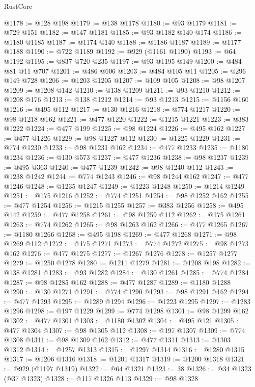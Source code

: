 \begin{lexlean}{RustCore}
\begin{coremodule}
@1178 := @128 @198
@1179 := @138 @1178
@1180 := @93 @1179
@1181 := @729 @151
@1182 := @147 @1181
@1185 := @93 @1182 @140 @174
@1186 := @1180 @1185
@1187 := @1174 @140
@1188 := @1186 @1187
@1189 := @1177 @1188
@1190 := @722 @1189
@1192 := @929 (@1161 @1190)
@1193 := @64 @1192
@1195 := @837 @720 @235
@1197 := @93 @1195 @149
@1200 := @484 @81 @11 @707
@1201 := @486 @606
@1203 := @484 @105 @11
@1205 := @296 @149 @728
@1206 := @1203 @1205
@1207 := @109 @105
@1208 := @98 @1207
@1209 := @1208 @142
@1210 := @138 @1209
@1211 := @93 @1210
@1212 := @1208 @176
@1213 := @138 @1212
@1214 := @93 @1213
@1215 := @1156 @160
@1216 := @495 @112
@1217 := @130 @1216
@1218 := @774 @1217
@1220 := @98 @1218 @162
@1221 := @477 @1220
@1222 := @1215 @1221
@1223 := @383 @1222
@1224 := @477 @199
@1225 := @98 @1224
@1226 := @495 @162
@1227 := @477 @1226
@1229 := @98 @1227 @112
@1230 := @1225 @1229
@1231 := @774 @1230
@1233 := @98 @1231 @162
@1234 := @477 @1233
@1235 := @1180 @1234
@1236 := @130 @573
@1237 := @477 @1236
@1238 := @98 @1237
@1239 := @495 @363
@1240 := @477 @1239
@1242 := @98 @1240 @112
@1243 := @1238 @1242
@1244 := @774 @1243
@1246 := @98 @1244 @162
@1247 := @477 @1246
@1248 := @1235 @1247
@1249 := @1223 @1248
@1250 := @1214 @1249
@1251 := @175 @1216
@1252 := @774 @1251
@1254 := @98 @1252 @162
@1255 := @477 @1254
@1256 := @1215 @1255
@1257 := @383 @1256
@1258 := @495 @142
@1259 := @477 @1258
@1261 := @98 @1259 @112
@1262 := @175 @1261
@1263 := @774 @1262
@1265 := @98 @1263 @162
@1266 := @477 @1265
@1267 := @1180 @1266
@1268 := @495 @198
@1269 := @477 @1268
@1271 := @98 @1269 @112
@1272 := @175 @1271
@1273 := @774 @1272
@1275 := @98 @1273 @162
@1276 := @477 @1275
@1277 := @1267 @1276
@1278 := @1257 @1277
@1279 := @1250 @1278
@1280 := @1211 @1279
@1281 := @1208 @198
@1282 := @138 @1281
@1283 := @93 @1282
@1284 := @130 @1261
@1285 := @774 @1284
@1287 := @98 @1285 @162
@1288 := @477 @1287
@1289 := @1180 @1288
@1290 := @130 @1271
@1291 := @774 @1290
@1293 := @98 @1291 @162
@1294 := @477 @1293
@1295 := @1289 @1294
@1296 := @1223 @1295
@1297 := @1283 @1296
@1298 := @197 @1229
@1299 := @774 @1298
@1301 := @98 @1299 @162
@1302 := @477 @1301
@1303 := @1180 @1302
@1304 := @495 @121
@1305 := @477 @1304
@1307 := @98 @1305 @112
@1308 := @197 @1307
@1309 := @774 @1308
@1311 := @98 @1309 @162
@1312 := @477 @1311
@1313 := @1303 @1312
@1314 := @1257 @1313
@1315 := @1297 @1314
@1316 := @1280 @1315
@1317 := @1206 @1316
@1318 := @1201 @1317
@1319 := @1200 @1318
@1321 := @929 (@1197 @1319)
@1322 := @64 @1321
@1323 := 38
@1326 := @34 @1323 (@37 @1323)
@1328 := @117 @1326 @113
@1329 := @98 @1328

\end{coremodule}
\end{lexlean}
